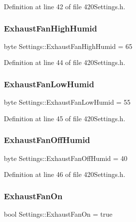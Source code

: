 Definition at line 42 of file 420\+Settings.\+h.

\mbox{\label{struct_settings_ae51922872fcad744ec751e36117c132e}} 
\subsubsection{\texorpdfstring{ExhaustFanHighHumid}{ExhaustFanHighHumid}}
{\footnotesize\ttfamily byte Settings\+::\+Exhaust\+Fan\+High\+Humid = 65}



Definition at line 44 of file 420\+Settings.\+h.

\mbox{\label{struct_settings_afba42aaf2fc61470eb823d18cf0dad61}} 
\subsubsection{\texorpdfstring{ExhaustFanLowHumid}{ExhaustFanLowHumid}}
{\footnotesize\ttfamily byte Settings\+::\+Exhaust\+Fan\+Low\+Humid = 55}



Definition at line 45 of file 420\+Settings.\+h.

\mbox{\label{struct_settings_ae217792a77cd103c8c0bd436122cd32c}} 
\subsubsection{\texorpdfstring{ExhaustFanOffHumid}{ExhaustFanOffHumid}}
{\footnotesize\ttfamily byte Settings\+::\+Exhaust\+Fan\+Off\+Humid = 40}



Definition at line 46 of file 420\+Settings.\+h.

\mbox{\label{struct_settings_ae8ca09bf2183dbcaf5d47b3e758d7955}} 
\subsubsection{\texorpdfstring{ExhaustFanOn}{ExhaustFanOn}}
{\footnotesize\ttfamily bool Settings\+::\+Exhaust\+Fan\+On = true}



